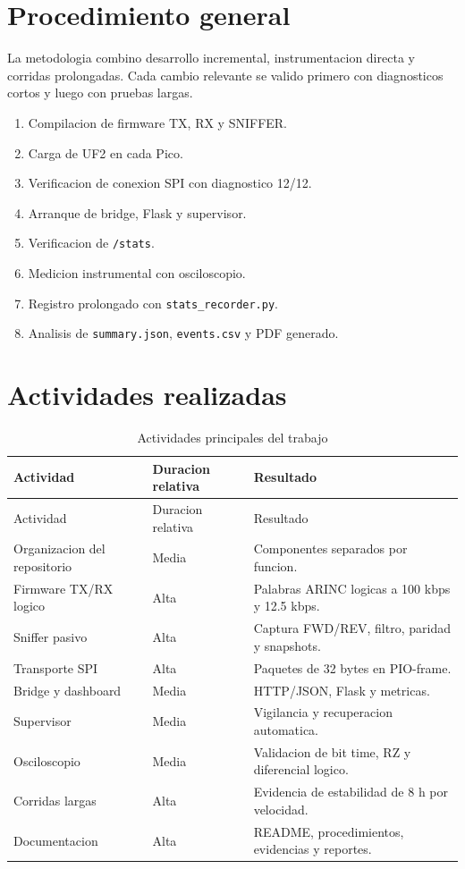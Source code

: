 \documentclass[12pt,a4paper,oneside]{report}
\begin{document}
\section{Procedimiento general}

La metodologia combino desarrollo incremental, instrumentacion directa y
corridas prolongadas. Cada cambio relevante se valido primero con diagnosticos
cortos y luego con pruebas largas.

\begin{enumerate}
  \item Compilacion de firmware TX, RX y SNIFFER.
  \item Carga de UF2 en cada Pico.
  \item Verificacion de conexion SPI con diagnostico 12/12.
  \item Arranque de bridge, Flask y supervisor.
  \item Verificacion de \texttt{/stats}.
  \item Medicion instrumental con osciloscopio.
  \item Registro prolongado con \texttt{stats\_recorder.py}.
  \item Analisis de \texttt{summary.json}, \texttt{events.csv} y PDF generado.
\end{enumerate}

\section{Actividades realizadas}

\begin{longtable}{p{}p{}p{}}
\caption{Actividades principales del trabajo}\\
\toprule
Actividad & Duracion relativa & Resultado \\
\midrule
\endfirsthead
\toprule
Actividad & Duracion relativa & Resultado \\
\midrule
\endhead
Organizacion del repositorio & Media & Componentes separados por funcion. \\
Firmware TX/RX logico & Alta & Palabras ARINC logicas a 100 kbps y 12.5 kbps. \\
Sniffer pasivo & Alta & Captura FWD/REV, filtro, paridad y snapshots. \\
Transporte SPI & Alta & Paquetes de 32 bytes en PIO-frame. \\
Bridge y dashboard & Media & HTTP/JSON, Flask y metricas. \\
Supervisor & Media & Vigilancia y recuperacion automatica. \\
Osciloscopio & Media & Validacion de bit time, RZ y diferencial logico. \\
Corridas largas & Alta & Evidencia de estabilidad de 8 h por velocidad. \\
Documentacion & Alta & README, procedimientos, evidencias y reportes. \\
\bottomrule
\end{longtable}
\end{document}
